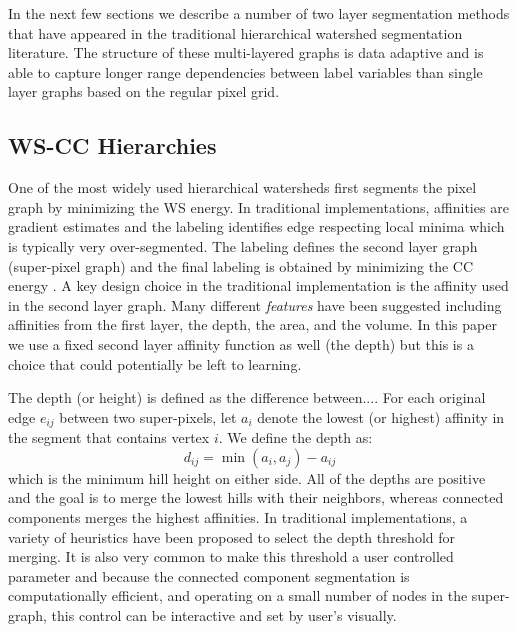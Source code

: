 \documentclass[letterpaper,twocolumn,fleqn]{article}
\begin{document}
In the next few sections we describe a number of two layer segmentation methods that have appeared in the traditional hierarchical watershed segmentation literature. The structure of these multi-layered graphs is data adaptive and is able to capture longer range dependencies between label variables than single layer graphs based on the regular pixel grid. 

\subsection{WS-CC Hierarchies}
\label{sec::WScc}

One of the most widely used hierarchical watersheds first segments the pixel graph by minimizing the WS energy. In traditional implementations, affinities are gradient estimates and the labeling identifies edge respecting local minima which is typically very over-segmented. The labeling defines the second layer graph (super-pixel graph) and the final labeling is obtained by minimizing the CC energy \cite{mangan}. A key design choice in the traditional implementation is the affinity used in the second layer graph. Many different \emph{features} have been suggested including affinities from the first layer, the depth, the area, and the volume. In this paper we use a fixed second layer affinity function as well (the depth) but this is a choice that could potentially be left to learning. 

The depth (or height) is defined as the difference between.... For each original edge $e_{ij}$ between two super-pixels, let $a_i$ denote the lowest (or highest) affinity in the segment that contains vertex $i$.  We define the depth as: 
\begin{equation} 
 d_{ij}=\min \left( a_i, a_j\right)-a_{ij}
\end{equation}
which is the minimum hill height on either side. All of the depths are positive and the goal is to merge the lowest hills with their neighbors, whereas connected components merges the highest affinities. In traditional implementations, a variety of heuristics have been proposed to select the depth threshold for merging. It is also very common to make this threshold a user controlled parameter and because the connected component segmentation is computationally efficient, and operating on a small number of nodes in the super-graph, this control can be interactive and set by user's visually. 
\end{document}
